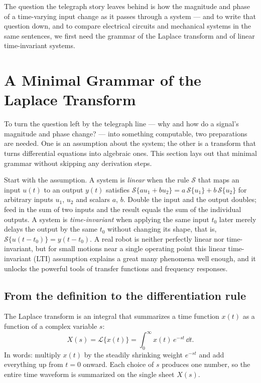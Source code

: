 The question the telegraph story leaves behind is how the magnitude and
phase of a time-varying input change as it passes through a system --- and to
write that question down, and to compare electrical circuits and mechanical
systems in the same sentences, we first need the grammar of the Laplace
transform and of linear time-invariant systems.

\section{A Minimal Grammar of the Laplace Transform}\label{sec:u5-laplace}

To turn the question left by the telegraph line --- why and how do a
signal's magnitude and phase change? --- into something computable, two
preparations are needed.
One is an assumption about the system; the other is a transform that turns
differential equations into algebraic ones.
This section lays out that minimal grammar without skipping any derivation
steps.

Start with the assumption.
A system is \emph{linear} when the rule $\mathcal{S}$ that maps an input
$u(t)$ to an output $y(t)$ satisfies
$\mathcal{S}\{a u_1 + b u_2\} = a\,\mathcal{S}\{u_1\} + b\,\mathcal{S}\{u_2\}$
for arbitrary inputs $u_1$, $u_2$ and scalars $a$, $b$.
Double the input and the output doubles; feed in the sum of two inputs and
the result equals the sum of the individual outputs.
A system is \emph{time-invariant} when applying the same input $t_0$ later
merely delays the output by the same $t_0$ without changing its shape,
that is, $\mathcal{S}\{u(t-t_0)\} = y(t-t_0)$.
A real robot is neither perfectly linear nor time-invariant, but for small
motions near a single operating point this linear time-invariant (LTI)
assumption explains a great many phenomena well enough, and it unlocks the
powerful tools of transfer functions and frequency responses.

\subsection{From the definition to the differentiation rule}

The Laplace transform is an integral that summarizes a time function $x(t)$
as a function of a complex variable $s$:
\begin{equation}
  X(s) = \mathcal{L}\{x(t)\}
  = \int_{0}^{\infty} x(t)\,e^{-st}\,\dd t.
  \label{eq:u5-laplace-def}
\end{equation}
In words: multiply $x(t)$ by the steadily shrinking weight $e^{-st}$ and add
everything up from $t=0$ onward.
Each choice of $s$ produces one number, so the entire time waveform is
summarized on the single sheet $X(s)$.

